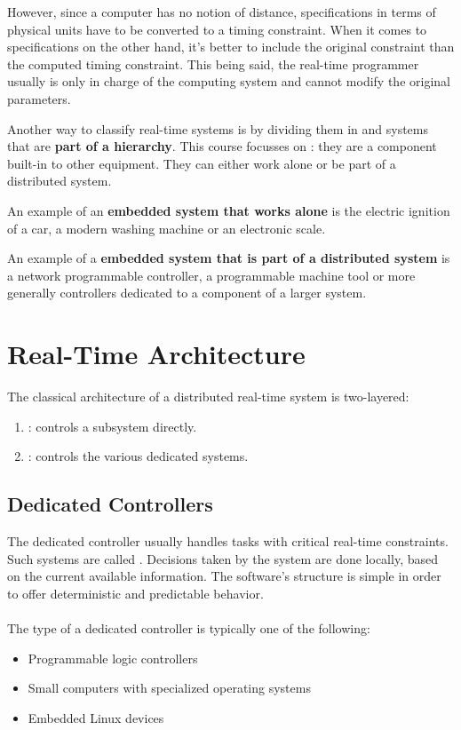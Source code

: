 \documentclass[../main.tex]{subfiles}
\begin{document}
However, since a computer has no notion of distance, specifications in terms of physical units have to be converted to a timing constraint.
When it comes to specifications on the other hand, it's better to include the original constraint than the computed timing constraint.
This being said, the real-time programmer usually is only in charge of the computing system and cannot modify the original parameters.

Another way to classify real-time systems is by dividing them in  and systems that are \textbf{part of a hierarchy}. This course focusses on : they are a component built-in to other equipment. They can either work alone or be part of a distributed system.

\begin{exmp}
An example of an \textbf{embedded system that works alone} is the electric ignition of a car, a modern washing machine or an electronic scale.
\end{exmp}

\begin{exmp}
An example of a \textbf{embedded system that is part of a distributed system} is a network programmable controller, a programmable machine tool or more generally controllers dedicated to a component of a larger system.
\end{exmp}


\section{Real-Time Architecture}
The classical architecture of a distributed real-time system is two-layered:
\begin{enumerate}
	\item {}: controls a subsystem directly.
	\item {}: controls the various dedicated systems.
\end{enumerate}

\subsection{Dedicated Controllers}
The dedicated controller usually handles tasks with critical real-time constraints. Such systems are called . Decisions taken by the system are done locally, based on the current available information. The software's structure is simple in order to offer deterministic and predictable behavior.
\\\\
The type of a dedicated controller is typically one of the following:
\begin{itemize}
	\item Programmable logic controllers
	\item Small computers with specialized operating systems
	\item Embedded Linux devices
\end{itemize}
\end{document}
